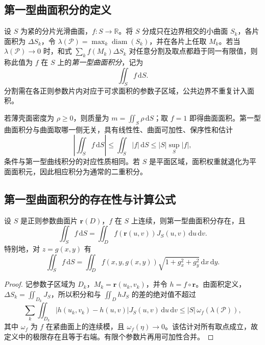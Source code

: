 \documentclass[UTF8,12pt,a4paper,fontset=fandol]{ctexbook}
\begin{document}
\subsection{第一型曲面积分的定义}
\label{subsec:definition-of-surface-integrals-of-the-first-kind}

\begin{definition}
\label{def:surface-integral-first-kind}
设 $S$ 为紧的分片光滑曲面，$f:S\to\mathbb R$。将 $S$ 分成只在边界相交的小曲面 $S_k$，各片面积为 $\Delta S_k$，令 $\lambda(\mathcal P)=\max_k\operatorname{diam}(S_k)$，并在各片上任取 $M_k$。若当 $\lambda(\mathcal P)\to0$ 时，和式 $\sum_k f(M_k)\Delta S_k$ 对任意分割及取点都趋于同一有限值，则称此值为 $f$ 在 $S$ 上的\emph{第一型曲面积分}，记为
\[
    \iint_S f\,\mathrm dS.
\]
分割需在各正则参数片内对应于可求面积的参数子区域，公共边界不重复计入面积。
\end{definition}

若薄壳面密度为 $\rho\geq0$，则质量为 $m=\iint_S\rho\,\mathrm dS$；取 $f=1$ 即得曲面面积。第一型曲面积分与曲面取哪一侧无关，具有线性性、曲面可加性、保序性和估计
\[
    \left|\iint_S f\,\mathrm dS\right|
    \leq\iint_S|f|\,\mathrm dS
    \leq |S|\sup_S|f|,
\]
条件与第一型曲线积分的对应性质相同。若 $S$ 是平面区域，面积权重就退化为平面面积元，因此相应积分为通常的二重积分。

\subsection{第一型曲面积分的存在性与计算公式}
\label{subsec:existence-and-evaluation-of-surface-integrals-of-the-first-kind}

\begin{theorem}
\label{thm:first-surface-integral-parametric}
设 $S$ 是正则参数曲面片 $\boldsymbol r(D)$，$f$ 在 $S$ 上连续，则第一型曲面积分存在，且
\begin{equation}
\label{eq:first-surface-integral-parametric}
    \iint_S f\,\mathrm dS
    =\iint_D f(\boldsymbol r(u,v))J_S(u,v)\,\mathrm du\,\mathrm dv.
\end{equation}
特别地，对 $z=g(x,y)$ 有
\[
    \iint_S f\,\mathrm dS
    =\iint_D f(x,y,g(x,y))\sqrt{1+g_x^2+g_y^2}\,\mathrm dx\,\mathrm dy.
\]
\end{theorem}

\begin{proof}
记参数子区域为 $D_k$，$M_k=\boldsymbol r(u_k,v_k)$，并令 $h=f\circ\boldsymbol r$。由面积定义，$\Delta S_k=\iint_{D_k}J_S$，所以积分和与 $\iint_DhJ_S$ 的差的绝对值不超过
\[
    \sum_k\iint_{D_k}
    |h(u_k,v_k)-h(u,v)|J_S(u,v)\,\mathrm du\,\mathrm dv
    \leq |S|\,\omega_f(\lambda(\mathcal P)),
\]
其中 $\omega_f$ 为 $f$ 在紧曲面上的连续模，且 $\omega_f(\eta)\to0$。该估计对所有取点成立，故定义中的极限存在且等于右端。有限个参数片再用可加性合并。
\end{proof}
\end{document}
